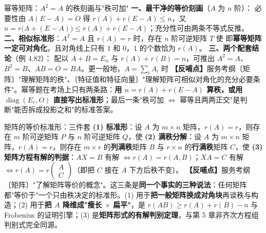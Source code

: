\begin{fdeep}{幂等矩阵：$A^{2}=A$ 的秩刻画与"秩可加"}
\textbf{一、最干净的等价刻画}（$A$ 为 $n$ 阶）：
必要性由 $A(E-A)=O$ 得 $r(A)+r(E-A)\le n$，又 $n=r\bigl(A+(E-A)\bigr)\le r(A)+r(E-A)$；充分性可由两条不等式反推。
\textbf{二、相似标准形}：$A^{2}=A$ 且 $r(A)=r$ 时，存在 $n$ 阶可逆矩阵 $T$ 使
即\textbf{幂等矩阵一定可对角化}，且对角线上只有 $1$ 和 $0$，$1$ 的个数恰为 $r(A)$。
\textbf{三、两个配套结论}（例 4.82）：
配以 $A+B=E_n$ 与 $r(A)+r(B)=n$，可推出 $A^{2}=A$、$B^{2}=B$、$AB=O=BA$。更一般地，$A=\sum_{i}A_{i}$ 时
\textbf{【反哺点】}服务考纲〔矩阵〕"理解矩阵的秩"、〔特征值和特征向量〕"理解矩阵可相似对角化的充分必要条件"。幂等题在考场上只有两条路：\textbf{用 $n=r(A)+r(E-A)$ 算秩，或用 $\operatorname{diag}(E_r,O)$ 直接写出标准形}；最后一条"秩可加 $\iff$ 幂等且两两正交"是判断"能否拆成投影之和"的标准答案。
\end{fdeep}


\begin{fdeep}{矩阵的等价标准形：三件套}
\textbf{(1) 标准形}：设 $A$ 为 $m\times n$ 矩阵，$r(A)=r$，则存在 $m$ 阶可逆矩阵 $P$ 与 $n$ 阶可逆矩阵 $Q$，使
\textbf{(2) 满秩分解}：设 $A$ 为 $m\times n$ 矩阵，$r(A)=r$，则存在 $m\times r$ 的\textbf{列满秩}矩阵 $B$ 与 $r\times n$ 的\textbf{行满秩}矩阵 $C$，使
\textbf{(3) 矩阵方程有解的判据}：$AX=B$ 有解 $\iff r(A)=r(A,B)$；$XA=C$ 有解 $\iff r(A)=r\begin{pmatrix}A\\ C\end{pmatrix}$（即把 $C$ 接在 $A$ 下方后秩不变）。
\textbf{【反哺点】}服务考纲〔矩阵〕"了解矩阵等价的概念"。这三条是\textbf{同一个事实的三种说法}：任何矩阵都"等价于"一个只由秩决定的标准形。(1) 用于\textbf{把一般矩阵换成对角块}再谈秩与构造；(2) 用于\textbf{把 $A$ 降维成"瘦长 $\times$ 扁平"}，是 $r(AB)\ge r(A)+r(B)-n$ 与 Frobenius 的证明引擎；(3) 是\textbf{矩阵形式的有解判别定理}，与第 5 章非齐次方程组判别式完全同源。
\end{fdeep}


